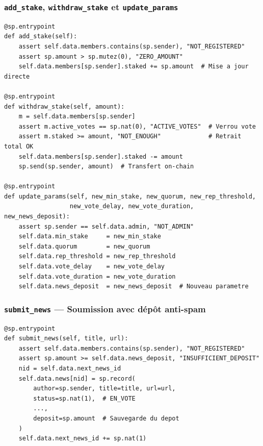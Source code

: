 \documentclass[12pt,a4paper]{article}
\newcommand{\entrypoint}[1]{\textcolor{primary}{\texttt{\textbf{#1}}}}
\begin{document}
\subsubsection{\entrypoint{add\_stake}, \entrypoint{withdraw\_stake} et \entrypoint{update\_params}}

\begin{lstlisting}[language=SmartPy, caption={Gestion du stake et paramètres admin}]
@sp.entrypoint
def add_stake(self):
    assert self.data.members.contains(sp.sender), "NOT_REGISTERED"
    assert sp.amount > sp.mutez(0), "ZERO_AMOUNT"
    self.data.members[sp.sender].staked += sp.amount  # Mise a jour directe

@sp.entrypoint
def withdraw_stake(self, amount):
    m = self.data.members[sp.sender]
    assert m.active_votes == sp.nat(0), "ACTIVE_VOTES"  # Verrou vote
    assert m.staked >= amount, "NOT_ENOUGH"             # Retrait total OK
    self.data.members[sp.sender].staked -= amount
    sp.send(sp.sender, amount)  # Transfert on-chain

@sp.entrypoint
def update_params(self, new_min_stake, new_quorum, new_rep_threshold,
                  new_vote_delay, new_vote_duration, new_news_deposit):
    assert sp.sender == self.data.admin, "NOT_ADMIN"
    self.data.min_stake     = new_min_stake
    self.data.quorum        = new_quorum
    self.data.rep_threshold = new_rep_threshold
    self.data.vote_delay    = new_vote_delay
    self.data.vote_duration = new_vote_duration
    self.data.news_deposit  = new_news_deposit  # Nouveau parametre
\end{lstlisting}

\subsubsection{\entrypoint{submit\_news} — Soumission avec dépôt anti-spam}

\begin{lstlisting}[language=SmartPy, caption={Entrypoint submit\_news avec dépôt}]
@sp.entrypoint
def submit_news(self, title, url):
    assert self.data.members.contains(sp.sender), "NOT_REGISTERED"
    assert sp.amount >= self.data.news_deposit, "INSUFFICIENT_DEPOSIT"
    nid = self.data.next_news_id
    self.data.news[nid] = sp.record(
        author=sp.sender, title=title, url=url,
        status=sp.nat(1),  # EN_VOTE
        ...,
        deposit=sp.amount  # Sauvegarde du depot
    )
    self.data.next_news_id += sp.nat(1)
\end{lstlisting}
\end{document}
